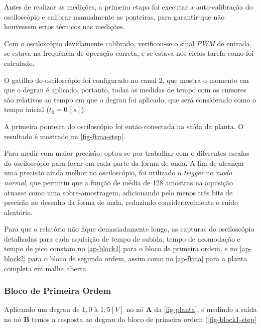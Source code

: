 \documentclass[
	12pt,				%
	article,			%
	openright,			%
	oneside,
	a4paper,			%
	chapter=TITLE,		%
	section=TITLE,		%
	english,			%
	french,				%
	spanish,			%
	brazil,				%
]{abntex2}
\begin{document}
        	Antes de realizar as medições, a primeira etapa foi executar a auto-calibração do osciloscópio e calibrar manualmente as ponteiras, para garantir que não houvessem erros técnicos nas medições.
        	
        	Com o osciloscópio devidamente calibrado, verificou-se o sinal \textit{PWM} de entrada, se estava na frequência de operação correta, e se estava nos ciclos-tarefa como foi calculado. 
        	
        	O gatilho do osciloscópio foi configurado no canal 2, que mostra o momento em que o degrau é aplicado, portanto, todas as medidas de tempo com os cursores são relativos ao tempo em que o degrau foi aplicado, que será considerado como o tempo inicial ($t_0=0\,[s]$).
        	
        	A primeira ponteira do osciloscópio foi então conectada na saída da planta. O resultado é mostrado na \autoref{fig-ftma-step}.
        	
        	Para medir com maior precisão, optou-se por trabalhar com o diferentes escalas do osciloscópio para focar em cada parte da forma de onda. A fim de alcançar uma precisão ainda melhor no osciloscópio, foi utilizado o \textit{trigger} no \textit{modo normal}, que permitiu que a função de média de 128 amostras na aquisição atuasse como uma sobre-amostragem, adicionando pelo menos três bits de precisão no desenho da forma de onda, reduzindo consideravelmente o ruído aleatório.
        	
        	Para que o relatório não fique demasiadamente longo, as capturas do osciloscópio detalhadas para cada aquisição de tempo de subida, tempo de acomodação e tempo de pico constam no \autoref{ap-block1} para o bloco de primeira ordem, e no \autoref{ap-block2} para o bloco de segunda ordem, assim como no \autoref{ap-ftma} para a planta completa em malha aberta.
    	
    	\subsubsection{Bloco de Primeira Ordem}
    	
        	Aplicando um degrau de $1,0$ à $1,5[V]$ no nó \textbf{A} da \autoref{fig-planta}, e medindo a saída no nó \textbf{B} temos a resposta ao degrau do bloco de primeira ordem (\autoref{fig-block1-step}
        	
\end{document}

